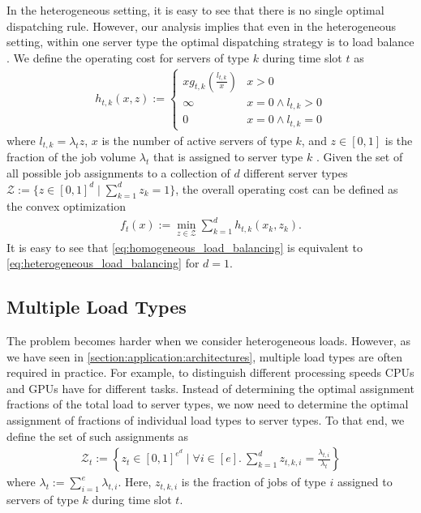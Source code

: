 In the heterogeneous setting, it is easy to see that there is no single optimal dispatching rule. However, our analysis implies that even in the heterogeneous setting, within one server type the optimal dispatching strategy is to load balance \cite{Albers2021_2}. We define the operating cost for servers of type $k$ during time slot $t$ as \begin{align}\label{eq:heterogeneous_load_balancing_unit}
    h_{t,k}(x,z) := \begin{cases}
        x g_{t,k}\left(\frac{l_{t,k}}{x}\right) & x > 0 \\
        \infty                                  & x = 0 \land l_{t,k} > 0 \\
        0                                       & x = 0 \land l_{t,k} = 0
    \end{cases}
\end{align} where $l_{t,k} = \lambda_t z$, $x$ is the number of active servers of type $k$, and $z \in [0,1]$ is the fraction of the job volume $\lambda_t$ that is assigned to server type $k$ \cite{Albers2021_2}. Given the set of all possible job assignments to a collection of $d$ different server types $\mathcal{Z} := \{z \in [0,1]^d \mid \sum_{k=1}^d z_k = 1\}$, the overall operating cost can be defined as the convex optimization \begin{align}\label{eq:heterogeneous_load_balancing}
    f_t(x) := \min_{z \in \mathcal{Z}} \sum_{k=1}^d h_{t,k}(x_k,z_k).
\end{align} It is easy to see that \autoref{eq:homogeneous_load_balancing} is equivalent to \autoref{eq:heterogeneous_load_balancing} for $d = 1$.

\subsection{Multiple Load Types}\label{section:application:dispatching:multiple_load_types}

The problem becomes harder when we consider heterogeneous loads. However, as we have seen in \autoref{section:application:architectures}, multiple load types are often required in practice. For example, to distinguish different processing speeds CPUs and GPUs have for different tasks. Instead of determining the optimal assignment fractions of the total load to server types, we now need to determine the optimal assignment of fractions of individual load types to server types. To that end, we define the set of such assignments as \begin{align*}
    \mathcal{Z}_t := \left\{z_t \in [0,1]^{e^d} \mid \forall i \in [e].\ \sum_{k=1}^d z_{t,k,i} = \frac{\lambda_{t,i}}{\lambda_t}\right\}
\end{align*} where $\lambda_t := \sum_{i=1}^e \lambda_{t,i}$. Here, $z_{t,k,i}$ is the fraction of jobs of type $i$ assigned to servers of type $k$ during time slot $t$.

